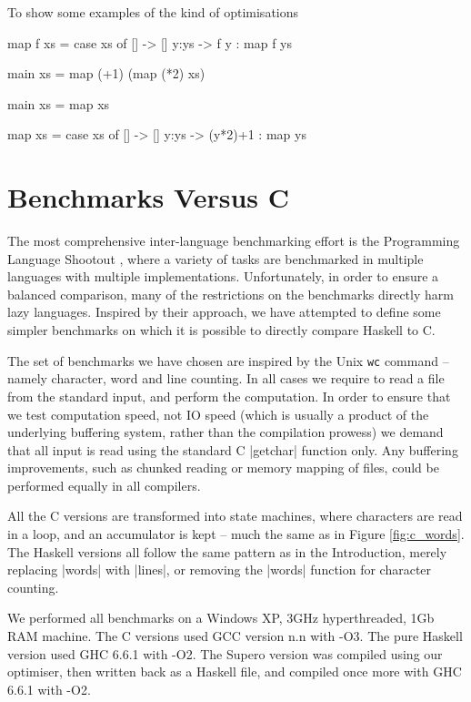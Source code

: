 \documentclass{llncs}
\begin{document}
To show some examples of the kind of optimisations

\begin{code}
map f xs = case  xs of
                 []    -> []
                 y:ys  -> f y : map f ys

main xs = map (+1) (map (*2) xs)
\end{code}

\begin{code}
main xs = map xs

map xs = case  xs of
               []    -> []
               y:ys  -> (y*2)+1 : map ys
\end{code}






\section{Benchmarks Versus C}

The most comprehensive inter-language benchmarking effort is the Programming Language Shootout \cite{shootout}, where a variety of tasks are benchmarked in multiple languages with multiple implementations. Unfortunately, in order to ensure a balanced comparison, many of the restrictions on the benchmarks directly harm lazy languages. Inspired by their approach, we have attempted to define some simpler benchmarks on which it is possible to directly compare Haskell to C.

The set of benchmarks we have chosen are inspired by the Unix \texttt{wc} command -- namely character, word and line counting. In all cases we require to read a file from the standard input, and perform the computation. In order to ensure that we test computation speed, not IO speed (which is usually a product of the underlying buffering system, rather than the compilation prowess) we demand that all input is read using the standard C |getchar| function only. Any buffering improvements, such as chunked reading or memory mapping of files, could be performed equally in all compilers.

All the C versions are transformed into state machines, where characters are read in a loop, and an accumulator is kept -- much the same as in Figure \ref{fig:c_words}. The Haskell versions all follow the same pattern as in the Introduction, merely replacing |words| with |lines|, or removing the |words| function for character counting.

We performed all benchmarks on a Windows XP, 3GHz hyperthreaded, 1Gb RAM machine. The C versions used GCC version n.n with -O3. The pure Haskell version used GHC 6.6.1 with -O2. The Supero version was compiled using our optimiser, then written back as a Haskell file, and compiled once more with GHC 6.6.1 with -O2.
\end{document}
